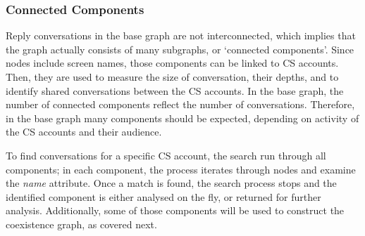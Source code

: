 \documentclass[sigconf]{acmart}
\begin{document}
{%


\subsubsection{Connected Components}

Reply conversations in the base graph are not interconnected, which
implies that the graph actually consists of many subgraphs, or
`connected components'. Since nodes include screen names, those
components can be linked to CS accounts. Then, they are used to
measure the size of conversation, their depths, and to identify shared
conversations between the CS accounts. In the base graph, the number
of connected components reflect the number of conversations. Therefore, in
the base graph many components should be expected, depending on
activity of the CS accounts and their audience.

To find conversations for a specific CS account, the search run
through all components; in each component, the process iterates
through nodes and examine the {\emph{name}} attribute. Once a match is
found, the search process stops and the identified component is either
analysed on the fly, or returned for further analysis. Additionally,
some of those components will be used to construct the coexistence
graph, as covered next.

}
\end{document}
